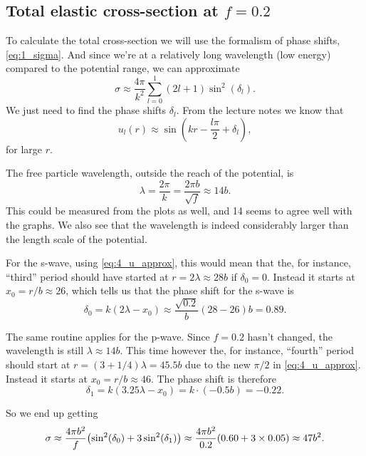 \documentclass[11pt,letter, swedish, english
]{article}
\begin{document}
\subsection{Total elastic cross-section at $f=0.2$}
To calculate the total cross-section we will use the formalism of
phase shifts, \eqref{eq:1_sigma}. 
And since we're at a relatively long wavelength (low energy) compared
to the potential range, we can approximate
\begin{equation}
\sigma\approx\frac{4\pi}{k^2}\sum_{l=0}^1(2l+1)\sin^2(\delta_l).
\end{equation}
We just need to find the phase shifts $\delta_l$. From the lecture
notes we know that
\begin{equation}\label{eq:4_u_approx}
u_l(r)\approx \sin(kr-\frac{l\pi}{2} + \delta_l),
\end{equation}
for large $r$.

The free particle wavelength, outside the reach of the potential, is 
\begin{equation}
\lambda=\frac{2\pi}{k}=\frac{2\pi b}{\sqrt{f}}
\approx 14 b.
\end{equation}
This could be measured from the plots as well, and 14 seems to agree
well with the graphs. We also see that the wavelength is indeed
considerably larger than the length scale of the potential. 

For the s-wave, using \eqref{eq:4_u_approx}, this would mean that the,
for instance, ``third'' period should have started at
$r=2\lambda\approx28b$ if $\delta_0=0$. Instead it starts at
$x_0=r/b\approx26$, which tells us that the phase shift for the s-wave
is  
\begin{equation}
\delta_0=k(2\lambda-x_0)\approx\frac{\sqrt{0.2}}{b}(28-26)b
=0.89.
\end{equation}


The same routine applies for the p-wave. Since $f=0.2$ hasn't changed,
the wavelength is still $\lambda\approx14b$. This time however the,
for instance, ``fourth'' period should start at
$r=(3+1/4)\lambda=45.5b$ due to the new $\pi/2$ in
\eqref{eq:4_u_approx}. Instead it starts at $x_0=r/b\approx46$.
The phase shift is therefore
\begin{equation}
\delta_1=k(3.25\lambda-x_0)=k\cdot(-0.5b)= -0.22.
\end{equation}


So we end up getting
\begin{equation}
\sigma\approx\frac{4\pi b^2}{f}
\qty(\sin^2(\delta_0)+3\sin^2(\delta_1))
\approx\frac{4\pi b^2}{0.2}\qty(0.60+3\times0.05)
\approx 47 b^2.
\end{equation}
\end{document}
